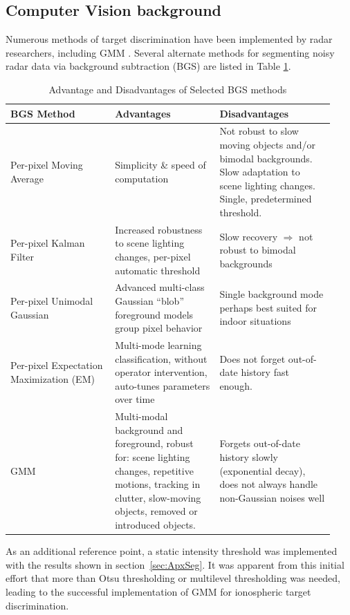 \subsection{Computer Vision background}
Numerous methods of target discrimination have been implemented by radar researchers, including GMM \citep{li2011gmm}.
Several alternate methods for segmenting noisy radar data via background subtraction (BGS) are listed in Table \ref{tab:PrevMeth}. 
\begin{table}\footnotesize	\centering
\caption{Advantage and Disadvantages of Selected BGS methods}\label{tab:PrevMeth}
\begin{tabular*}{1\textwidth}{p{0.3\linewidth}p{0.3\linewidth}p{0.33\linewidth}}
		\toprule
		BGS Method & Advantages & Disadvantages\\
		\midrule
		Per-pixel Moving Average & Simplicity \& speed of computation & Not robust to slow moving objects and/or bimodal backgrounds. Slow adaptation to scene lighting changes. Single, predetermined threshold. \\
		Per-pixel Kalman Filter \citep{ridder1995,koller1994a,koller1994b} & Increased robustness to scene lighting changes, per-pixel automatic threshold & Slow recovery $\Rightarrow$ not robust to bimodal backgrounds \\
		Per-pixel Unimodal Gaussian \citep{pfinder1997} & Advanced multi-class Gaussian ``blob'' foreground models group pixel behavior & Single background mode perhaps best suited for indoor situations\\
		Per-pixel Expectation Maximization (EM) \citep{friedman1997} & Multi-mode learning classification, without operator intervention, auto-tunes parameters over time & Does not forget out-of-date history fast enough. \\
		GMM & Multi-modal background and foreground, robust for: scene lighting changes, repetitive motions, tracking in clutter, slow-moving objects, removed or introduced objects. & Forgets out-of-date history slowly (exponential decay), does not always handle non-Gaussian noises well\\
		\bottomrule
\end{tabular*}
\end{table}
As an additional reference point, a static intensity threshold was implemented with the results shown in section~\ref{sec:ApxSeg}.
It was apparent from this initial effort that more than Otsu thresholding \citep{otsu1979} or multilevel thresholding \citep{huang2011} was needed, leading to the successful implementation of GMM for ionospheric target discrimination.

